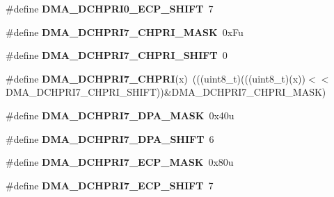 \begin{DoxyCompactItemize}
\item 
\#define {\bfseries D\+M\+A\+\_\+\+D\+C\+H\+P\+R\+I0\+\_\+\+E\+C\+P\+\_\+\+S\+H\+I\+FT}~7\hypertarget{group__DMA__Register__Masks_ga77a342f1130e8d8aaccfd88774100b38}{}\label{group__DMA__Register__Masks_ga77a342f1130e8d8aaccfd88774100b38}

\item 
\#define {\bfseries D\+M\+A\+\_\+\+D\+C\+H\+P\+R\+I7\+\_\+\+C\+H\+P\+R\+I\+\_\+\+M\+A\+SK}~0x\+Fu\hypertarget{group__DMA__Register__Masks_ga105d024654066128f4e62f32f8ca830d}{}\label{group__DMA__Register__Masks_ga105d024654066128f4e62f32f8ca830d}

\item 
\#define {\bfseries D\+M\+A\+\_\+\+D\+C\+H\+P\+R\+I7\+\_\+\+C\+H\+P\+R\+I\+\_\+\+S\+H\+I\+FT}~0\hypertarget{group__DMA__Register__Masks_ga0ae4f29819a1dfb16bbffee2db4d558e}{}\label{group__DMA__Register__Masks_ga0ae4f29819a1dfb16bbffee2db4d558e}

\item 
\#define {\bfseries D\+M\+A\+\_\+\+D\+C\+H\+P\+R\+I7\+\_\+\+C\+H\+P\+RI}(x)~(((uint8\+\_\+t)(((uint8\+\_\+t)(x))$<$$<$D\+M\+A\+\_\+\+D\+C\+H\+P\+R\+I7\+\_\+\+C\+H\+P\+R\+I\+\_\+\+S\+H\+I\+FT))\&D\+M\+A\+\_\+\+D\+C\+H\+P\+R\+I7\+\_\+\+C\+H\+P\+R\+I\+\_\+\+M\+A\+SK)\hypertarget{group__DMA__Register__Masks_gae06b4c8f0c37e7dc457e9a43673cbe4e}{}\label{group__DMA__Register__Masks_gae06b4c8f0c37e7dc457e9a43673cbe4e}

\item 
\#define {\bfseries D\+M\+A\+\_\+\+D\+C\+H\+P\+R\+I7\+\_\+\+D\+P\+A\+\_\+\+M\+A\+SK}~0x40u\hypertarget{group__DMA__Register__Masks_gab10ff916f8dfc06df312689bd2dd36f5}{}\label{group__DMA__Register__Masks_gab10ff916f8dfc06df312689bd2dd36f5}

\item 
\#define {\bfseries D\+M\+A\+\_\+\+D\+C\+H\+P\+R\+I7\+\_\+\+D\+P\+A\+\_\+\+S\+H\+I\+FT}~6\hypertarget{group__DMA__Register__Masks_ga531216c2edb80108b8c4cd13883aef06}{}\label{group__DMA__Register__Masks_ga531216c2edb80108b8c4cd13883aef06}

\item 
\#define {\bfseries D\+M\+A\+\_\+\+D\+C\+H\+P\+R\+I7\+\_\+\+E\+C\+P\+\_\+\+M\+A\+SK}~0x80u\hypertarget{group__DMA__Register__Masks_ga544768122b9d6cea0945411c14c5f79f}{}\label{group__DMA__Register__Masks_ga544768122b9d6cea0945411c14c5f79f}

\item 
\#define {\bfseries D\+M\+A\+\_\+\+D\+C\+H\+P\+R\+I7\+\_\+\+E\+C\+P\+\_\+\+S\+H\+I\+FT}~7\hypertarget{group__DMA__Register__Masks_gad2c636360eb68d654d17b99db5d849d6}{}\label{group__DMA__Register__Masks_gad2c636360eb68d654d17b99db5d849d6}


\end{DoxyCompactItemize}
